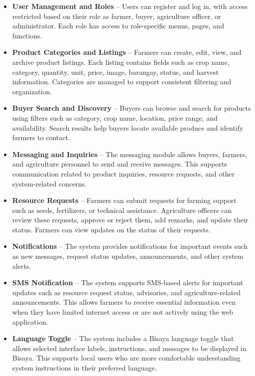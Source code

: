\begin{itemize}
    \item \textbf{User Management and Roles} -- Users can register and log in, with access restricted based on their role as farmer, buyer, agriculture officer, or administrator. Each role has access to role-specific menus, pages, and functions.
    
    \item \textbf{Product Categories and Listings} -- Farmers can create, edit, view, and archive product listings. Each listing contains fields such as crop name, category, quantity, unit, price, image, barangay, status, and harvest information. Categories are managed to support consistent filtering and organization.
    
    \item \textbf{Buyer Search and Discovery} -- Buyers can browse and search for products using filters such as category, crop name, location, price range, and availability. Search results help buyers locate available produce and identify farmers to contact.
    
    \item \textbf{Messaging and Inquiries} -- The messaging module allows buyers, farmers, and agriculture personnel to send and receive messages. This supports communication related to product inquiries, resource requests, and other system-related concerns.
    
    \item \textbf{Resource Requests} -- Farmers can submit requests for farming support such as seeds, fertilizers, or technical assistance. Agriculture officers can review these requests, approve or reject them, add remarks, and update their status. Farmers can view updates on the status of their requests.
    
    \item \textbf{Notifications} -- The system provides notifications for important events such as new messages, request status updates, announcements, and other system alerts.
    
    \item \textbf{SMS Notification} -- The system supports SMS-based alerts for important updates such as resource request status, advisories, and agriculture-related announcements. This allows farmers to receive essential information even when they have limited internet access or are not actively using the web application.
    
    \item \textbf{Language Toggle} -- The system includes a Bisaya language toggle that allows selected interface labels, instructions, and messages to be displayed in Bisaya. This supports local users who are more comfortable understanding system instructions in their preferred language.
    

\end{itemize}

